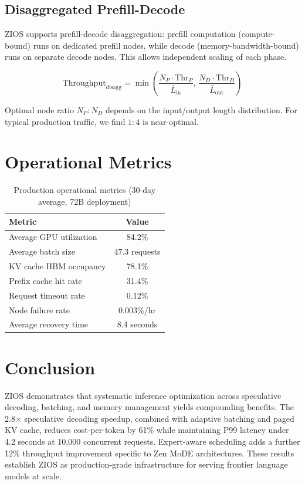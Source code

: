 \documentclass[11pt,a4paper]{article}
\begin{document}
\subsection{Disaggregated Prefill-Decode}

ZIOS supports prefill-decode disaggregation: prefill computation (compute-bound) runs on dedicated prefill nodes, while decode (memory-bandwidth-bound) runs on separate decode nodes. This allows independent scaling of each phase.

\begin{equation}
\text{Throughput}_{\text{disagg}} = \min\!\left(\frac{N_P \cdot \text{Thr}_P}{\bar{L}_{\text{in}}},\, \frac{N_D \cdot \text{Thr}_D}{\bar{L}_{\text{out}}}\right)
\end{equation}

Optimal node ratio $N_P : N_D$ depends on the input/output length distribution. For typical production traffic, we find $1:4$ is near-optimal.

\section{Operational Metrics}

\begin{table}[H]
\centering
\caption{Production operational metrics (30-day average, 72B deployment)}
\label{tab:ops}
\begin{tabular}{lc}
\toprule
Metric & Value \\
\midrule
Average GPU utilization & 84.2\% \\
Average batch size & 47.3 requests \\
KV cache HBM occupancy & 78.1\% \\
Prefix cache hit rate & 31.4\% \\
Request timeout rate & 0.12\% \\
Node failure rate & 0.003\%/hr \\
Average recovery time & 8.4 seconds \\
\bottomrule
\end{tabular}
\end{table}

\section{Conclusion}

ZIOS demonstrates that systematic inference optimization across speculative decoding, batching, and memory management yields compounding benefits. The 2.8$\times$ speculative decoding speedup, combined with adaptive batching and paged KV cache, reduces cost-per-token by 61\% while maintaining P99 latency under 4.2 seconds at 10,000 concurrent requests. Expert-aware scheduling adds a further 12\% throughput improvement specific to Zen MoDE architectures. These results establish ZIOS as production-grade infrastructure for serving frontier language models at scale.
\end{document}

